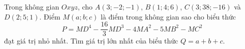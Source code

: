 \begin{ex}
Trong không gian $Oxyz$, cho $A(3;-2;-1)$, $B(1;4;6)$, $C(3;38;-16)$ và $D(2;5;1)$. Điểm $M(a;b;c)$ là điểm trong không gian sao cho biểu thức \[P=MD^4-\dfrac{16}3MD^3-4MA^2-5MB^2-MC^2\] đạt giá trị nhỏ nhất. Tìm giá trị lớn nhất của biểu thức $Q=a+b+c$.
\end{ex}

